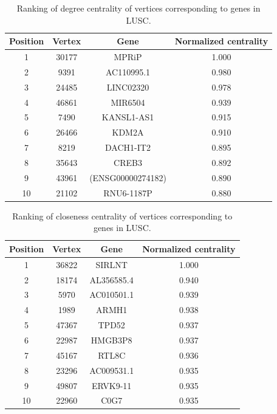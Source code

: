 \documentclass[12pt,a4paper]{report}
\begin{document}
\begin{table}[H]
\centering
\caption{Ranking of degree centrality of vertices corresponding to genes in LUSC.}
\label{tab:lusc1}
\begin{tabular}{cccc}
\hline
\textbf{Position}         & \textbf{Vertex}     & \textbf{Gene}   & \textbf{Normalized centrality}   \\
\hline
   1       &    30177       &   MPRiP        & 1.000           \\
   2      &   9391        &  AC110995.1         &  0.980          \\
   3       &   24485        &  LINC02320         & 0.978           \\
   4       &    46861       & MIR6504          & 0.939           \\
   5       &   7490        &    KANSL1-AS1       &     0.915       \\
   6       &       26466    &  KDM2A         & 0.910           \\
   7       &      8219     &      DACH1-IT2     &     0.895       \\
   8       &      35643     &     CREB3      & 0.892           \\
   9       &      43961     &     (ENSG00000274182)      &   0.890         \\
   10       &    21102       &      RNU6-1187P     &   0.880         \\
\hline
\end{tabular}
\end{table}

\begin{table}[H]
\centering
\caption{Ranking of closeness centrality of vertices corresponding to genes in LUSC.}
\label{tab:lusc2}
\begin{tabular}{cccc}
\hline
\textbf{Position}         & \textbf{Vertex}     & \textbf{Gene}   & \textbf{Normalized centrality}   \\
\hline
   1       &    36822       &   SIRLNT        &   1.000         \\
   2      &     18174      &    AL356585.4       &   0.940         \\
   3       &     5970      &  AC010501.1         &   0.939         \\
   4       &     1989      &   ARMH1        &      0.938      \\
   5       &     47367      &    TPD52       &  0.937          \\
   6       &     22987      &    HMGB3P8       &     0.937       \\
   7       &     45167      &    RTL8C       &      0.936      \\
   8       &     23296      &    AC009531.1       &      0.935      \\
   9       &      49807     &   ERVK9-11        & 0.935           \\
   10       &      22960     &     C0G7      &      0.935      \\
\hline
\end{tabular}
\end{table}
\end{document}
